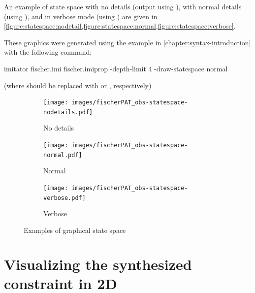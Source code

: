 \begin{example}
	An example of state space with no details (output using ), with normal details (using ), and in verbose mode (using ) are given in \cref{figure:statespace:nodetail,figure:statespace:normal,figure:statespace:verbose}.

	These graphics were generated using the example in \cref{chapter:syntax-introduction} with the following command:

\begin{terminal}
imitator fischer.imi fischer.imiprop -depth-limit 4 -draw-statespace normal
\end{terminal}

	(where  should be replaced with  or , respectively)
\end{example}

\begin{figure}
	\centering
	\begin{subfigure}[b]{.48\textwidth}
		\texttt{[image: images/fischerPAT\_obs-statespace-nodetails.pdf]}

		\caption{No details}
		\label{figure:statespace:nodetail}
	\end{subfigure}
	\begin{subfigure}[b]{.48\textwidth}
		\texttt{[image: images/fischerPAT\_obs-statespace-normal.pdf]}

		\caption{Normal}
		\label{figure:statespace:normal}
	\end{subfigure}

	\begin{subfigure}[b]{.75\textwidth}
		\texttt{[image: images/fischerPAT\_obs-statespace-verbose.pdf]}

		\caption{Verbose}
		\label{figure:statespace:verbose}
	\end{subfigure}

	\caption{Examples of graphical state space}
\end{figure}



\section{Visualizing the synthesized constraint in 2D}

